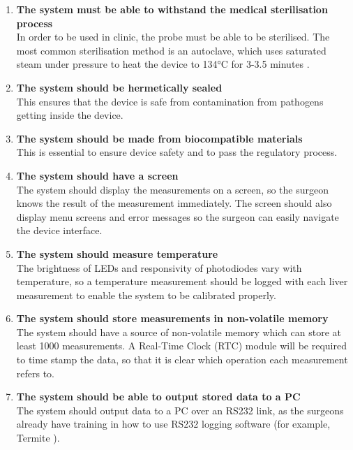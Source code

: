 \begin{enumerate}
\item \label{req: sterilise} \textbf{The system must be able to withstand the medical sterilisation process}\\
In order to be used in clinic, the probe must be able to be sterilised. The most common sterilisation method is an autoclave, which uses saturated steam under pressure to heat the device to 134\si{\celsius} for 3-3.5 minutes \cite{nhs_autoclave}.

\item \label{req: seal} \textbf{The system should be hermetically sealed}\\
This ensures that the device is safe from contamination from pathogens getting inside the device.

\item \label{req: biocompatible} \textbf{The system should be made from biocompatible materials}\\
This is essential to ensure device safety and to pass the regulatory process.




\item \label{req: screen} \textbf{The system should have a screen}\\
The system should display the measurements on a screen, so the surgeon knows the result of the measurement immediately. The screen should also display menu screens and error messages so the surgeon can easily navigate the device interface.

\item \label{req: temperature} \textbf{The system should measure temperature}\\
The brightness of LEDs and responsivity of photodiodes vary with temperature, so a temperature measurement should be logged with each liver measurement to enable the system to be calibrated properly.

\item \label{req: memory} \textbf{The system should store measurements in non-volatile memory}\\
The system should have a source of non-volatile memory which can store at least 1000 measurements. A Real-Time Clock (RTC) module will be required to time stamp the data, so that it is clear which operation each measurement refers to.

\item \label{req: rs232} \textbf{The system should be able to output stored data to a PC}\\
The system should output data to a PC over an RS232 link, as the surgeons already have training in how to use RS232 logging software (for example, Termite \cite{termite}).


\end{enumerate}
